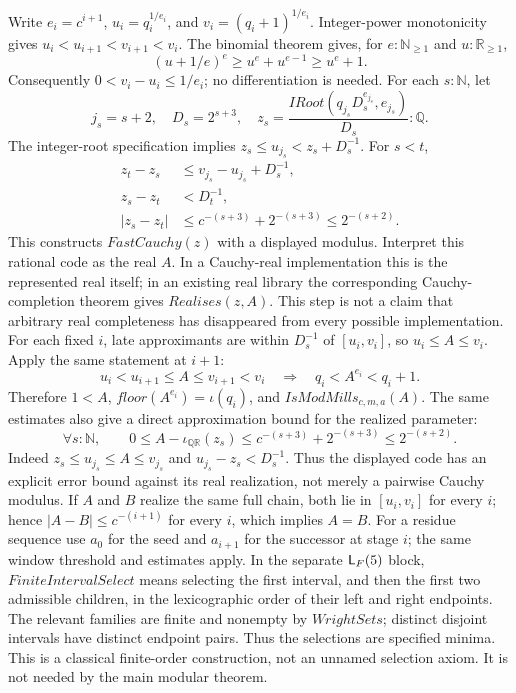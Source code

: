 \documentclass[11pt,reqno]{amsart}
\makeatletter
\newcommand{\N}{\mathbb N}
\newcommand{\Q}{\mathbb Q}
\newcommand{\R}{\mathbb R}
\newcommand{\Np}{\N_{\ge1}}
\theoremstyle{blueplain}
\newcommand{\defref}[1]{\hyperref[#1]{Definition~\ref*{#1}}}
\numberwithin{equation}{section}
\DeclareRobustCommand{\defref}[1]{%
  \hyperlink{def:#1}{\ensuremath{\csname PredicateName@#1\endcsname}}}
\DeclareRobustCommand{\proofref}[2]{\hyperlink{proof:#1}{\ensuremath{#2}}}
\def\defref#1{#1}%
\def\proofref#1#2{#2}%
\def\hyperlink#1#2{#2}}
\makeatother
\begin{document}
Write $e_i=c^{i+1}$, $u_i=q_i^{1/e_i}$, and
$v_i=(q_i+1)^{1/e_i}$. Integer-power monotonicity gives
$u_i<u_{i+1}<v_{i+1}<v_i$. The binomial theorem gives, for
$e:\Np$ and $u:\R_{\ge1}$,
\[
(u+1/e)^e\ge u^e+u^{e-1}\ge u^e+1.
\]
Consequently $0<v_i-u_i\le1/e_i$; no differentiation is needed.
For each $s:\N$, let
\[
j_s=s+2,\quad D_s=2^{s+3},\quad
z_s=\frac{\defref{IRoot}(q_{j_s}D_s^{e_{j_s}},e_{j_s})}{D_s}:\Q.
\]
The integer-root specification implies
$z_s\le u_{j_s}<z_s+D_s^{-1}$. For $s<t$,
\[
\begin{aligned}
z_t-z_s&\le v_{j_s}-u_{j_s}+D_s^{-1},\\
z_s-z_t&<D_t^{-1},\\
|z_s-z_t|&\le c^{-(s+3)}+2^{-(s+3)}
\le2^{-(s+2)}.
\end{aligned}
\]
This constructs $\defref{FastCauchy}(z)$ with a displayed modulus.
Interpret this rational code as the real $A$. In a Cauchy-real
implementation this is the represented real itself; in an existing real
library the corresponding Cauchy-completion theorem gives
$\defref{Realises}(z,A)$. This step is not a claim that arbitrary real
completeness has disappeared from every possible implementation.
For each fixed $i$, late approximants are within $D_s^{-1}$ of
$[u_i,v_i]$, so $u_i\le A\le v_i$. Apply the same statement at $i+1$:
\[
u_i<u_{i+1}\le A\le v_{i+1}<v_i
\quad\Longrightarrow\quad q_i<A^{e_i}<q_i+1.
\]
Therefore $1<A$, $\defref{floor}(A^{e_i})=\iota(q_i)$, and
$\defref{IsModMills}_{c,m,a}(A)$. The same estimates also give a direct
approximation bound for the realized parameter:
\[
\forall s:\N,\qquad
0\le A-\iota_{\Q\R}(z_s)
\le c^{-(s+3)}+2^{-(s+3)}\le2^{-(s+2)}.
\]
Indeed $z_s\le u_{j_s}\le A\le v_{j_s}$ and
$u_{j_s}-z_s<D_s^{-1}$. Thus the displayed code has an explicit error
bound against its real realization, not merely a pairwise Cauchy modulus.
If $A$ and $B$ realize the same full
chain, both lie in $[u_i,v_i]$ for every $i$; hence
$|A-B|\le c^{-(i+1)}$ for every $i$, which implies $A=B$.
For a residue sequence use $a_0$ for the seed and $a_{i+1}$ for the
successor at stage $i$; the same window threshold and estimates apply.
In the separate $\proofref{L-F}{\textsf L_F}(5)$ block, $\defref{FiniteIntervalSelect}$
means selecting the first interval, and then the first two admissible children,
in the lexicographic order of their left and right endpoints. The relevant
families are finite and nonempty by $\defref{WrightSets}$; distinct disjoint
intervals have distinct endpoint pairs. Thus the selections are specified
minima. This is a classical finite-order construction, not an unnamed
selection axiom. It is not needed by the main modular theorem.
\end{document}
